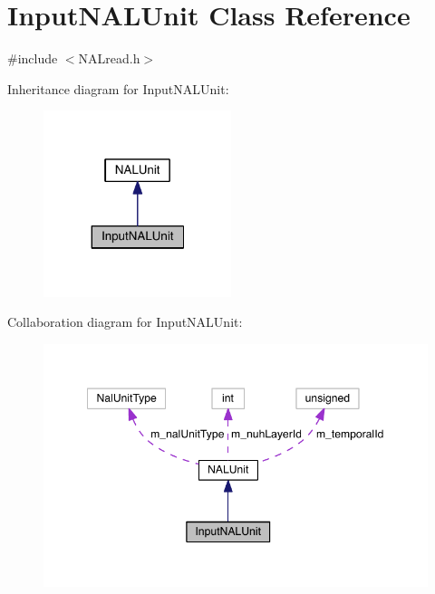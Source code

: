 \hypertarget{class_input_n_a_l_unit}{}\section{Input\+N\+A\+L\+Unit Class Reference}
\label{class_input_n_a_l_unit}


{\ttfamily \#include $<$N\+A\+Lread.\+h$>$}



Inheritance diagram for Input\+N\+A\+L\+Unit\+:
\nopagebreak
\begin{figure}[H]
\begin{center}
\leavevmode
\includegraphics[width=155pt]{de/d28/class_input_n_a_l_unit__inherit__graph}
\end{center}
\end{figure}


Collaboration diagram for Input\+N\+A\+L\+Unit\+:
\nopagebreak
\begin{figure}[H]
\begin{center}
\leavevmode
\includegraphics[width=348pt]{d9/d68/class_input_n_a_l_unit__coll__graph}
\end{center}
\end{figure}
